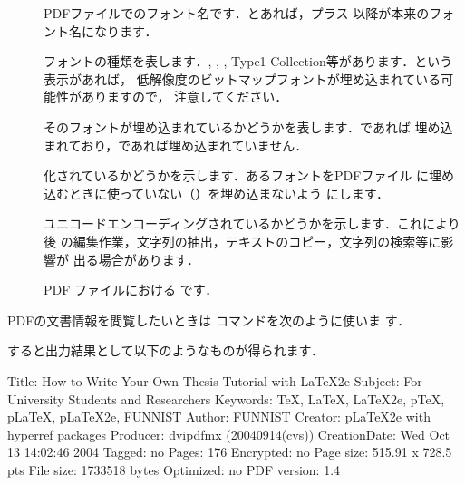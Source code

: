 \begin{description}
 \item[]
%
    PDFファイルでのフォント名です．とあれば，プラス
    \str{+}以降が本来のフォント名になります．
 \item[]
%
    フォントの種類を表します．, , , 
    Type1 Collection等があります．という表示があれば，
    低解像度のビットマップフォントが埋め込まれている可能性がありますので，
   注意してください．
 \item[]
    そのフォントが埋め込まれているかどうかを表します．であれば
    埋め込まれており，であれば埋め込まれていません．
 \item[]
    化されているかどうかを示します．あるフォントをPDFファイル
    に埋め込むときに使っていない（）を埋め込まないよう
    にします．
 \item[]
%
%
%
%
%
    {ユニコードエンコーディング}されているかどうかを示します．これにより後
    の編集作業，文字列の抽出，テキストのコピー，文字列の検索等に影響が
    出る場合があります．
 \item[]
    PDF ファイルにおける です．
\end{description}

PDFの文書情報を閲覧したいときは コマンドを次のように使いま
す．

\begin{InTerm}
\end{InTerm}

すると出力結果として以下のようなものが得られます．

\begin{plainfile}
Title:          How to Write Your Own Thesis Tutorial with LaTeX2e 
Subject:        For University Students and Researchers
Keywords:       TeX, LaTeX, LaTeX2e, pTeX, pLaTeX, pLaTeX2e, FUNNIST
Author:         FUNNIST
Creator:        pLaTeX2e with hyperref packages
Producer:       dvipdfmx (20040914(cvs))
CreationDate:   Wed Oct 13 14:02:46 2004
Tagged:         no
Pages:          176
Encrypted:      no
Page size:      515.91 x 728.5 pts
File size:      1733518 bytes
Optimized:      no
PDF version:    1.4 
\end{plainfile}

